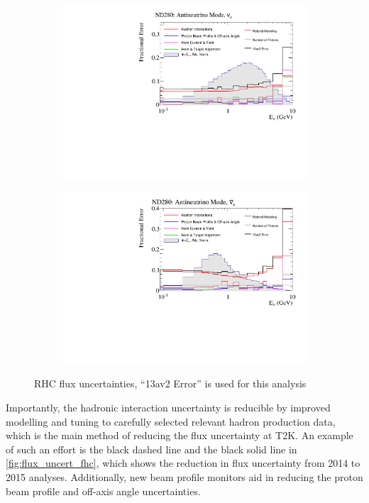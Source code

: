 \begin{figure}[h]
	\begin{subfigure}[t]{0.42\textwidth}
		\includegraphics[width=\textwidth, trim={0mm 0mm 0mm 0mm}, clip,page=1]{figures/flux/total_err_nd5_anumode_nue}
	\end{subfigure}
	\begin{subfigure}[t]{0.42\textwidth}
		\includegraphics[width=\textwidth, trim={0mm 0mm 0mm 0mm}, clip,page=1]{figures/flux/total_err_nd5_anumode_nueb}
	\end{subfigure}
\caption{RHC flux uncertainties, ``13av2 Error'' is used for this analysis}
\label{fig:flux_uncert_rhc}
\end{figure}

Importantly, the hadronic interaction uncertainty is reducible by improved modelling and tuning to carefully selected relevant hadron production data, which is the main method of reducing the flux uncertainty at T2K. An example of such an effort is the black dashed line and the black solid line in \autoref{fig:flux_uncert_fhc}, which shows the reduction in flux uncertainty from 2014 to 2015 analyses. Additionally, new beam profile monitors aid in reducing the proton beam profile and off-axis angle uncertainties.

